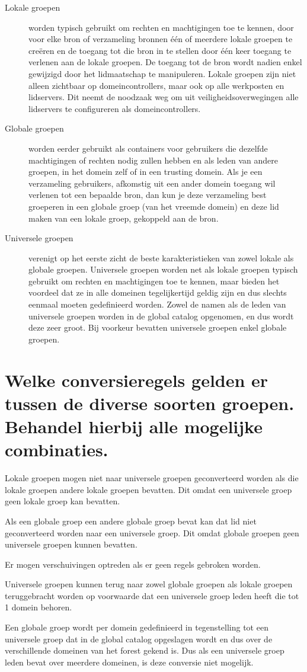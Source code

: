 \begin{description}
	\item[Lokale groepen] worden typisch gebruikt om rechten en machtigingen
		toe te kennen, door voor elke bron of verzameling bronnen één of
		meerdere lokale groepen te creëren en de toegang tot die bron in
		te stellen door één keer toegang te verlenen aan de lokale
		groepen. De toegang tot de bron wordt nadien enkel gewijzigd
		door het lidmaatschap te manipuleren. Lokale groepen zijn niet
		alleen zichtbaar op domeincontrollers, maar ook op alle
		werkposten en lidservers. Dit neemt de noodzaak weg om uit
		veiligheidsoverwegingen alle lidservers te configureren als
		domeincontrollers.
	\item[Globale groepen] worden eerder gebruikt als containers voor
		gebruikers die dezelfde machtigingen of rechten nodig zullen
		hebben en als leden van andere groepen, in het domein zelf of in
		een trusting domein. Als je een verzameling gebruikers,
		afkomstig uit een ander domein toegang wil verlenen tot een
		bepaalde bron, dan kun je deze verzameling best groeperen in een
		globale groep (van het vreemde domein) en deze lid maken van een
		lokale groep, gekoppeld aan de bron.
	\item[Universele groepen] verenigt op het eerste zicht de beste
		karakteristieken van zowel lokale als globale groepen.
		Universele groepen worden net als lokale groepen typisch
		gebruikt om rechten en machtigingen toe te kennen, maar bieden
		het voordeel dat ze in alle domeinen tegelijkertijd geldig zijn
		en dus slechts eenmaal moeten gedefinieerd worden. Zowel de
		namen als de leden van universele groepen worden in de global
		catalog opgenomen, en dus wordt deze zeer groot. Bij voorkeur
		bevatten universele groepen enkel globale groepen.
\end{description}

\section{Welke conversieregels gelden er tussen de diverse soorten groepen.
Behandel hierbij alle mogelijke combinaties.}

Lokale groepen mogen niet naar universele groepen geconverteerd worden als die
lokale groepen andere lokale groepen bevatten. Dit omdat een universele groep
geen lokale groep kan bevatten.

Als een globale groep een andere globale groep bevat kan dat lid niet
geconverteerd worden naar een universele groep. Dit omdat globale groepen geen
universele groepen kunnen bevatten.

Er mogen verschuivingen optreden als er geen regels gebroken worden.

Universele groepen kunnen terug naar zowel globale groepen als lokale groepen
teruggebracht worden op voorwaarde dat een universele groep leden heeft die tot
1 domein behoren.

Een globale groep wordt per domein gedefinieerd in tegenstelling tot een
universele groep dat in de global catalog opgeslagen wordt en dus over de
verschillende domeinen van het forest gekend is. Dus als een universele groep
leden bevat over meerdere domeinen, is deze conversie niet mogelijk.
